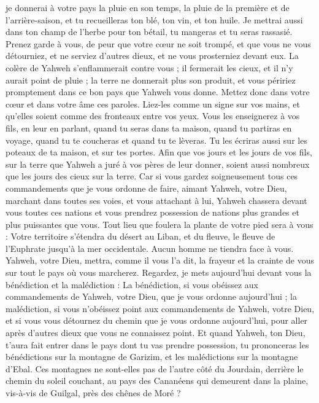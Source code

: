 \begin{multicols}{2}
je donnerai à votre pays la pluie en son temps, la pluie de la première et de l’arrière-saison, et tu recueilleras ton blé, ton vin, et ton huile.
Je mettrai aussi dans ton champ de l'herbe pour ton bétail, tu mangeras et tu seras rassasié.
Prenez garde à vous, de peur que votre cœur ne soit trompé, et que vous ne vous détourniez, et ne serviez d'autres dieux, et ne vous prosterniez devant eux.
La colère de Yahweh s'enflammerait contre vous ; il fermerait les cieux, et il n'y aurait point de pluie ; la terre ne donnerait plus son produit, et vous péririez promptement dans ce bon pays que Yahweh vous donne.
Mettez donc dans votre cœur et dans votre âme ces paroles. Liez-les comme un signe sur vos mains, et qu’elles soient comme des fronteaux entre vos yeux.
Vous les enseignerez à vos fils, en leur en parlant, quand tu seras dans ta maison, quand tu partiras en voyage, quand tu te coucheras et quand tu te lèveras.
Tu les écriras aussi sur les poteaux de ta maison, et sur tes portes.
Afin que vos jours et les jours de vos fils, sur la terre que Yahweh a juré à vos pères de leur donner, soient aussi nombreux que les jours des cieux sur la terre.
Car si vous gardez soigneusement tous ces commandements que je vous ordonne de faire, aimant Yahweh, votre Dieu, marchant dans toutes ses voies, et vous attachant à lui,
Yahweh chassera devant vous toutes ces nations et vous prendrez possession de nations plus grandes et plus puissantes que vous.
Tout lieu que foulera la plante de votre pied sera à vous : Votre territoire s’étendra du désert au Liban, et du fleuve, le fleuve de l’Euphrate jusqu'à la mer occidentale.
Aucun homme ne tiendra face à vous. Yahweh, votre Dieu, mettra, comme il vous l’a dit, la frayeur et la crainte de vous sur tout le pays où vous marcherez.
Regardez, je mets aujourd'hui devant vous la bénédiction et la malédiction :
La bénédiction, si vous obéissez aux commandements de Yahweh, votre Dieu, que je vous ordonne aujourd'hui ;
la malédiction, si vous n'obéissez point aux commandements de Yahweh, votre Dieu, et si vous vous détournez du chemin que je vous ordonne aujourd'hui, pour aller après d'autres dieux que vous ne connaissez point.
Et quand Yahweh, ton Dieu, t'aura fait entrer dans le pays dont tu vas prendre possession, tu prononceras les bénédictions sur la montagne de Garizim, et les malédictions sur la montagne d’Ebal.
Ces montagnes ne sont-elles pas de l’autre côté du Jourdain, derrière le chemin du soleil couchant, au pays des Cananéens qui demeurent dans la plaine, vis-à-vis de Guilgal, près des chênes de Moré ?

\end{multicols}
